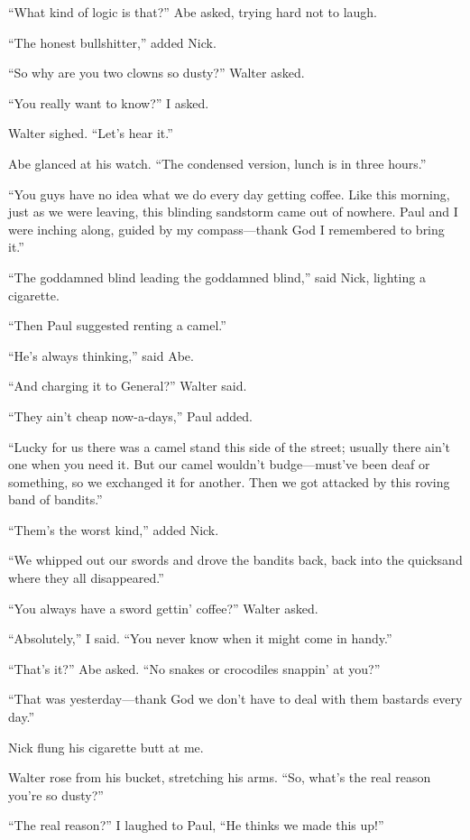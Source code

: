 ``What kind of logic is that?'' Abe asked, trying hard not to laugh.

``The honest bullshitter,'' added Nick.

``So why are you two clowns so dusty?'' Walter asked.

``You really want to know?'' I asked.

Walter sighed. ``Let's hear it.''

Abe glanced at his watch. ``The condensed version, lunch is in three
hours.''

``You guys have no idea what we do every day getting coffee. Like this
morning, just as we were leaving, this blinding sandstorm came out of
nowhere. Paul and I were inching along, guided by my com\-pass---thank God
I remembered to bring it.''

``The goddamned blind leading the goddamned blind,'' said Nick, lighting
a cigarette.

``Then Paul suggested renting a camel.''

``He's always thinking,'' said Abe.

``And charging it to General?'' Walter said.

``They ain't cheap now-a-days,'' Paul added.

``Lucky for us there was a camel stand this side of the street; usually
there ain't one when you need it. But our camel wouldn't budge---must've
been deaf or something, so we exchanged it for another. Then we got
attacked by this roving band of bandits.''

``Them's the worst kind,'' added Nick.

``We whipped out our swords and drove the bandits back, back into the
quicksand where they all disappeared.''

``You always have a sword gettin' coffee?'' Walter asked.

``Absolutely,'' I said. ``You never know when it might come in handy.''

``That's it?'' Abe asked. ``No snakes or crocodiles snappin' at you?''

``That was yesterday---thank God we don't have to deal with them
bastards every day.''

Nick flung his cigarette butt at me.

Walter rose from his bucket, stretching his arms. ``So, what's the real
reason you're so dusty?''

``The real reason?'' I laughed to Paul, ``He thinks we made this up!''

